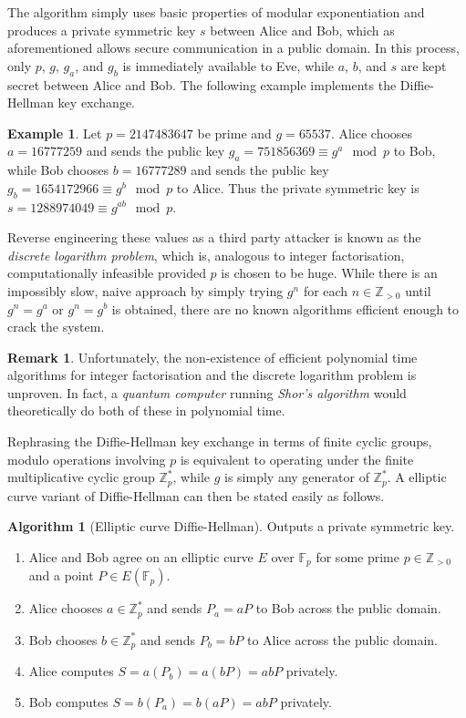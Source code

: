 \documentclass{article}
\newcommand{\F}{\mathbb{F}}
\newcommand{\Z}{\mathbb{Z}}
\newcommand{\rb}[1]{\left( #1 \right)}
\theoremstyle{definition}
\newtheorem*{example}{Example}
\newtheorem*{remark}{Remark}
\newtheorem{algorithm}[proposition]{Algorithm}
\begin{document}
The algorithm simply uses basic properties of modular exponentiation and produces a private symmetric key $ s $ between Alice and Bob, which as aforementioned allows secure communication in a public domain. In this process, only $ p $, $ g $, $ g_a $, and $ g_b $ is immediately available to Eve, while $ a $, $ b $, and $ s $ are kept secret between Alice and Bob. The following example implements the Diffie-Hellman key exchange.

\begin{example}
Let $ p = 2147483647 $ be prime and $ g = 65537 $. Alice chooses $ a = 16777259 $ and sends the public key $ g_a = 751856369 \equiv g^a \mod p $ to Bob, while Bob chooses $ b = 16777289 $ and sends the public key $ g_b = 1654172966 \equiv g^b \mod p $ to Alice. Thus the private symmetric key is $ s = 1288974049 \equiv g^{ab} \mod p $.
\end{example}

Reverse engineering these values as a third party attacker is known as the \emph{discrete logarithm problem}, which is, analogous to integer factorisation, computationally infeasible provided $ p $ is chosen to be huge. While there is an impossibly slow, naive approach by simply trying $ g^n $ for each $ n \in \Z_{> 0} $ until $ g^n = g^a $ or $ g^n = g^b $ is obtained, there are no known algorithms efficient enough to crack the system.

\begin{remark}
Unfortunately, the non-existence of efficient polynomial time algorithms for integer factorisation and the discrete logarithm problem is unproven. In fact, a \emph{quantum computer} running \emph{Shor's algorithm} would theoretically do both of these in polynomial time.
\end{remark}

Rephrasing the Diffie-Hellman key exchange in terms of finite cyclic groups, modulo operations involving $ p $ is equivalent to operating under the finite multiplicative cyclic group $ \Z_p^* $, while $ g $ is simply any generator of $ \Z_p^* $. A elliptic curve variant of Diffie-Hellman can then be stated easily as follows.

\begin{algorithm}[Elliptic curve Diffie-Hellman]
Outputs a private symmetric key.
\begin{enumerate}
\item Alice and Bob agree on an elliptic curve $ E $ over $ \F_p $ for some prime $ p \in \Z_{> 0} $ and a point $ P \in E\rb{\F_p} $.
\item Alice chooses $ a \in \Z_p^* $ and sends $ P_a = aP $ to Bob across the public domain.
\item Bob chooses $ b \in \Z_p^* $ and sends $ P_b = bP $ to Alice across the public domain.
\item Alice computes $ S = a\rb{P_b} = a\rb{bP} = abP $ privately.
\item Bob computes $ S = b\rb{P_a} = b\rb{aP} = abP $ privately.
\end{enumerate}
\end{algorithm}
\end{document}
